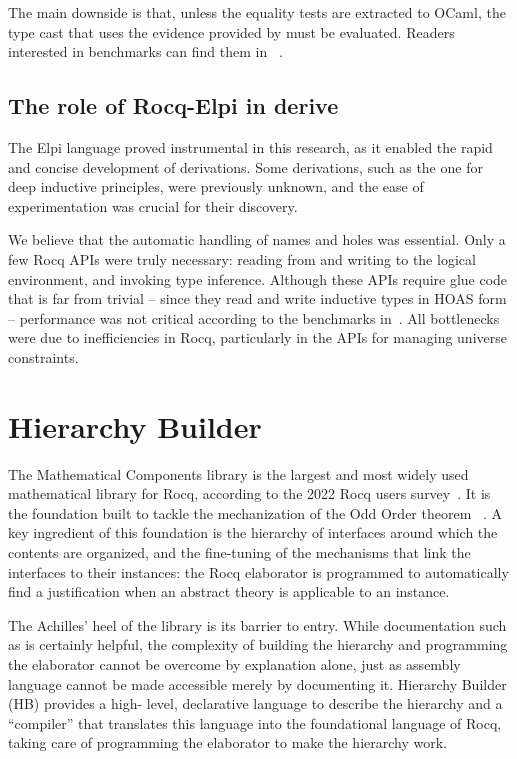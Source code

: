 \documentclass[a4paper, 11pt]{book}
\begin{document}
The main downside is that, unless the equality tests are extracted to OCaml,
the type cast that uses the evidence provided by  must be
evaluated. Readers interested in benchmarks can find them in
~\cite{gregoire:hal-03800154}.

\subsection{The role of Rocq-Elpi in derive}
The Elpi language proved instrumental in this research, as it enabled the
rapid and concise development of derivations. Some derivations, such as the one
for deep inductive principles, were previously unknown, and the ease of
experimentation was crucial for their discovery.

We believe that the automatic handling of names and holes was essential. Only a
few Rocq APIs were truly necessary: reading from and writing to the logical
environment, and invoking type inference. Although these APIs require glue code
that is far from trivial -- since they read and write inductive types in HOAS
form -- performance was not critical according to the benchmarks in~\cite{gregoire:hal-03800154}. All bottlenecks were due to inefficiencies
in Rocq, particularly in the APIs for managing universe constraints.


\section{Hierarchy Builder}\label{sec:hb}


The Mathematical Components library is the largest and most widely used
mathematical library for Rocq, according to the 2022 Rocq users
survey~\cite{dealmeidaborges_et_al:LIPIcs.ITP.2023.12}. It is the foundation
built to tackle the mechanization of the Odd Order theorem
~\cite{DBLP:conf/itp/GonthierAABCGRMOBPRSTT13}. A key ingredient of this
foundation is the hierarchy of interfaces around which the contents are
organized, and the fine-tuning of the mechanisms that link the interfaces to
their instances: the Rocq elaborator is programmed to automatically find a
justification when an abstract theory is applicable to an instance.

The Achilles' heel of the library is its barrier to entry. While documentation
such as \cite{assia_mahboubi_2022_7118596} is certainly helpful, the
complexity of building the hierarchy and programming the elaborator cannot be
overcome by explanation alone, just as assembly language cannot be made
accessible merely by documenting it. Hierarchy Builder (HB) provides a high-
level, declarative language to describe the hierarchy and a ``compiler'' that
translates this language into the foundational language of Rocq, taking care of
programming the elaborator to make the hierarchy work.
\end{document}
